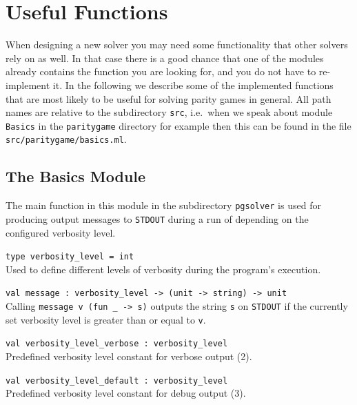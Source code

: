\section{Useful Functions}

When designing a new solver you may need some functionality that other solvers rely on as well. In that
case there is a good chance that one of the modules already contains the function you are looking for,
and you do not have to re-implement it. In the following we describe some of the implemented functions
that are most likely to be useful for solving parity games in general. All path names are relative to
the subdirectory \texttt{src}, i.e.\ when we speak about module \texttt{Basics} in the \texttt{paritygame}
directory for example then this can be found in the file \texttt{src/paritygame/basics.ml}.

\subsection{The {\ttfamily Basics} Module}

The main function in this module in the subdirectory \texttt{pgsolver} is used for producing output 
messages to \texttt{STDOUT} during a run of \pgsolver depending on the configured verbosity level.

\begin{description}
\itemsep3mm
\item \verb+type verbosity_level = int+\ \\
Used to define different levels of verbosity during the program's execution.

\item \verb+val message : verbosity_level -> (unit -> string) -> unit+ \ \\
Calling \verb+message v (fun _ -> s)+ outputs the string \verb+s+ on \texttt{STDOUT} if the currently
set verbosity level is greater than or equal to \verb+v+.

\item \verb+val verbosity_level_verbose : verbosity_level+ \ \\
Predefined verbosity level constant for verbose output (2).

\item \verb+val verbosity_level_default : verbosity_level+ \ \\
Predefined verbosity level constant for debug output (3).
\end{description}


